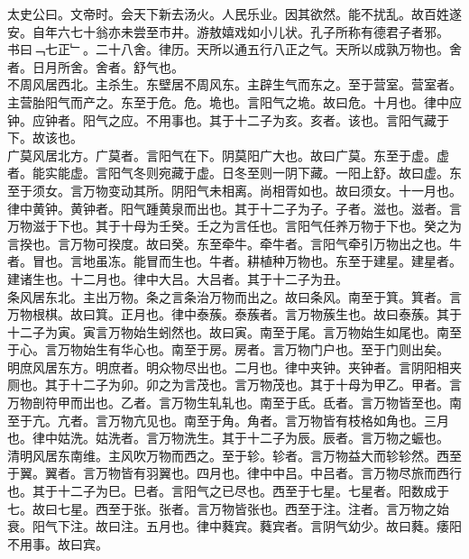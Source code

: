 \documentclass{zhvt-classic}
\begin{document}
\hspace*{2em}太史公曰。文帝时。会天下新去汤火。人民乐业。因其欲然。能不扰乱。故百姓遂安。自年六七十翁亦未尝至市井。游敖嬉戏如小儿状。孔子所称有德君子者邪。\\
\hspace*{2em}书曰﹁七正﹂。二十八舍。律历。天所以通五行八正之气。天所以成孰万物也。舍者。日月所舍。舍者。舒气也。\\
\hspace*{2em}不周风居西北。主杀生。东壁居不周风东。主辟生气而东之。至于营室。营室者。主营胎阳气而产之。东至于危。危。垝也。言阳气之垝。故曰危。十月也。律中应钟。应钟者。阳气之应。不用事也。其于十二子为亥。亥者。该也。言阳气藏于下。故该也。\\
\hspace*{2em}广莫风居北方。广莫者。言阳气在下。阴莫阳广大也。故曰广莫。东至于虚。虚者。能实能虚。言阳气冬则宛藏于虚。日冬至则一阴下藏。一阳上舒。故曰虚。东至于须女。言万物变动其所。阴阳气未相离。尚相胥如也。故曰须女。十一月也。律中黄钟。黄钟者。阳气踵黄泉而出也。其于十二子为子。子者。滋也。滋者。言万物滋于下也。其于十母为壬癸。壬之为言任也。言阳气任养万物于下也。癸之为言揆也。言万物可揆度。故曰癸。东至牵牛。牵牛者。言阳气牵引万物出之也。牛者。冒也。言地虽冻。能冒而生也。牛者。耕植种万物也。东至于建星。建星者。建诸生也。十二月也。律中大吕。大吕者。其于十二子为丑。\\
\hspace*{2em}条风居东北。主出万物。条之言条治万物而出之。故曰条风。南至于箕。箕者。言万物根棋。故曰箕。正月也。律中泰蔟。泰蔟者。言万物蔟生也。故曰泰蔟。其于十二子为寅。寅言万物始生蚓然也。故曰寅。南至于尾。言万物始生如尾也。南至于心。言万物始生有华心也。南至于房。房者。言万物门户也。至于门则出矣。\\
\hspace*{2em}明庶风居东方。明庶者。明众物尽出也。二月也。律中夹钟。夹钟者。言阴阳相夹厕也。其于十二子为卯。卯之为言茂也。言万物茂也。其于十母为甲乙。甲者。言万物剖符甲而出也。乙者。言万物生轧轧也。南至于氐。氐者。言万物皆至也。南至于亢。亢者。言万物亢见也。南至于角。角者。言万物皆有枝格如角也。三月也。律中姑洗。姑洗者。言万物洗生。其于十二子为辰。辰者。言万物之蜄也。\\
\hspace*{2em}清明风居东南维。主风吹万物而西之。至于轸。轸者。言万物益大而轸轸然。西至于翼。翼者。言万物皆有羽翼也。四月也。律中中吕。中吕者。言万物尽旅而西行也。其于十二子为巳。巳者。言阳气之已尽也。西至于七星。七星者。阳数成于七。故曰七星。西至于张。张者。言万物皆张也。西至于注。注者。言万物之始衰。阳气下注。故曰注。五月也。律中蕤宾。蕤宾者。言阴气幼少。故曰蕤。痿阳不用事。故曰宾。\\
\end{document}
